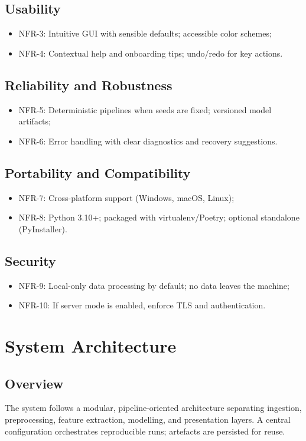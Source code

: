 \subsection{Usability}
\begin{itemize}
    \item NFR-3: Intuitive GUI with sensible defaults; accessible color schemes;
    \item NFR-4: Contextual help and onboarding tips; undo/redo for key actions.
\end{itemize}

\subsection{Reliability and Robustness}
\begin{itemize}
    \item NFR-5: Deterministic pipelines when seeds are fixed; versioned model artifacts;
    \item NFR-6: Error handling with clear diagnostics and recovery suggestions.
\end{itemize}

\subsection{Portability and Compatibility}
\begin{itemize}
    \item NFR-7: Cross-platform support (Windows, macOS, Linux);
    \item NFR-8: Python 3.10+; packaged with virtualenv/Poetry; optional standalone (PyInstaller).
\end{itemize}

\subsection{Security}
\begin{itemize}
    \item NFR-9: Local-only data processing by default; no data leaves the machine;
    \item NFR-10: If server mode is enabled, enforce TLS and authentication.
\end{itemize}

\section{System Architecture}
\subsection{Overview}
The system follows a modular, pipeline-oriented architecture separating ingestion, preprocessing, feature extraction, modelling, and presentation layers. A central configuration orchestrates reproducible runs; artefacts are persisted for reuse.

